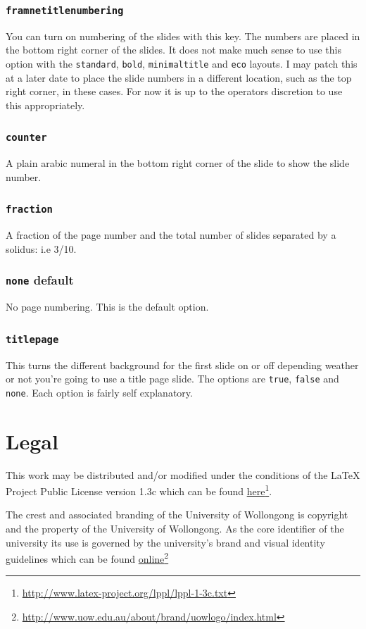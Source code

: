 \documentclass[a4paper,oneside,12pt]{article}
\newcommand{\key}[1]{\texttt{\color{UOWorange}#1}}
\newcommand{\val}[1]{\texttt{\color{UOWblue}#1}}
\begin{document}
\subsubsection*{\key{framnetitlenumbering}}
You can turn on numbering of the slides with this key. The numbers are placed in the bottom right corner of the slides. It does not make much sense to use this option with the \val{standard}, \val{bold}, \val{minimaltitle} and \val{eco} layouts. I may patch this at a later date to place the slide numbers in a different location, such as the top right corner, in these cases. For now it is up to the operators discretion to use this appropriately.

\subsubsection*{\val{counter}}
A plain arabic numeral in the bottom right corner of the slide to show the slide number.

\subsubsection*{\val{fraction}}
A fraction of the page number and the total number of slides separated by a solidus: i.e 3/10.

\subsubsection*{\val{none} default}
No page numbering. This is the default option.


\subsubsection*{\key{titlepage}}
This turns the different background for the first slide on or off depending weather or not you're going to use a title page slide. The options are \val{true}, \val{false} and \val{none}. Each option is fairly self explanatory.


\section{Legal}
This work may be distributed and/or modified under the conditions of the LaTeX Project Public License version 1.3c which can be found \href{http://www.latex-project.org/lppl/lppl-1-3c.txt}{here}\footnote{\url{http://www.latex-project.org/lppl/lppl-1-3c.txt}}.

The crest and associated branding of the University of Wollongong is copyright and the property of the University of Wollongong. As the core identifier of the university its use is governed by the university's brand and visual identity guidelines which can be found \href{http://www.uow.edu.au/about/brand/uowlogo/index.html}{online}\footnote{\url{http://www.uow.edu.au/about/brand/uowlogo/index.html}}
\end{document}
